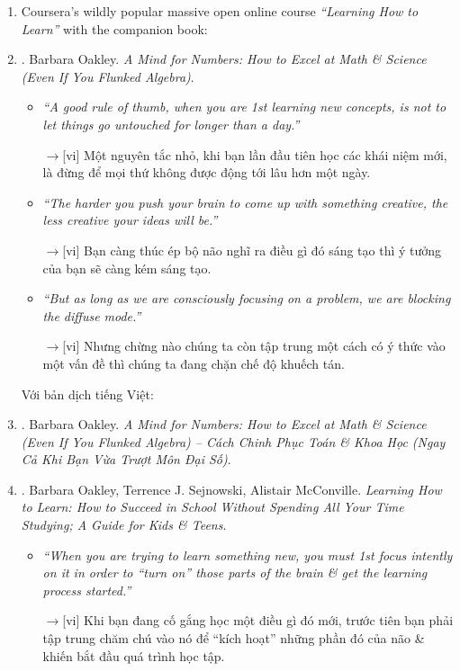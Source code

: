 \documentclass[12pt,oneside]{book}
\begin{document}
\begin{enumerate}
	\item {\sc Coursera}'s wildly popular massive open online course {\it``Learning How to Learn''} with the companion book:	
	\item \cite{Oakley_mind_number}. {\sc Barbara Oakley}. {\it A Mind for Numbers: How to Excel at Math \& Science (Even If You Flunked Algebra)}.
	\begin{itemize}
		\item {\it``A good rule of thumb, when you are 1st learning new concepts, is not to let things go untouched for longer than a day.''}
		
		{\sf[en]$\to$[vi]} Một nguyên tắc nhỏ, khi bạn lần đầu tiên học các khái niệm mới, là đừng để mọi thứ không được động tới lâu hơn một ngày.
		
		\item {\it``The harder you push your brain to come up with something creative, the less creative your ideas will be.''}
		
		{\sf[en]$\to$[vi]} Bạn càng thúc ép bộ não nghĩ ra điều gì đó sáng tạo thì ý tưởng của bạn sẽ càng kém sáng tạo.
		
		\item {\it``But as long as we are consciously focusing on a problem, we are blocking the diffuse mode.''}
		
		{\sf[en]$\to$[vi]} Nhưng chừng nào chúng ta còn tập trung một cách có ý thức vào một vấn đề thì chúng ta đang chặn chế độ khuếch tán.
	\end{itemize}
	Với bản dịch tiếng Việt:
	\item \cite{Oakley_mind_number_VN}. {\sc Barbara Oakley}. {\it A Mind for Numbers: How to Excel at Math \& Science (Even If You Flunked Algebra) -- Cách Chinh Phục Toán \& Khoa Học (Ngay Cả Khi Bạn Vừa Trượt Môn Đại Số)}.
	\item \cite{Oakley_Sejnowski_McConville_learn_how_learn}. {\sc Barbara Oakley, Terrence J. Sejnowski, Alistair McConville}. {\it Learning How to Learn: How to Succeed in School Without Spending All Your Time Studying; A Guide for Kids \& Teens}.
	\begin{itemize}
		\item {\it``When you are trying to learn something new, you must 1st focus intently on it in order to ``turn on'' those parts of the brain \& get the learning process started.''}
		
		{\sf[en]$\to$[vi]} Khi bạn đang cố gắng học một điều gì đó mới, trước tiên bạn phải tập trung chăm chú vào nó để ``kích hoạt'' những phần đó của não \& khiến bắt đầu quá trình học tập.
		

\end{itemize}
\end{enumerate}
\end{document}
